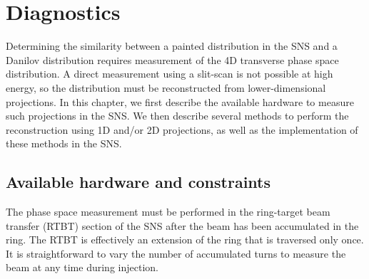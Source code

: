 \chapter{Diagnostics} \label{chap-4}

Determining the similarity between a painted distribution in the SNS and a Danilov distribution requires measurement of the 4D transverse phase space distribution. A direct measurement using a slit-scan \cite{Cathey2018} is not possible at high energy, so the distribution must be reconstructed from lower-dimensional projections. In this chapter, we first describe the available hardware to measure such projections in the SNS. We then describe several methods to perform the reconstruction using 1D and/or 2D projections, as well as the implementation of these methods in the SNS.


\section{Available hardware and constraints}

The phase space measurement must be performed in the ring-target beam transfer (RTBT) section of the SNS after the beam has been accumulated in the ring. The RTBT is effectively an extension of the ring that is traversed only once. It is straightforward to vary the number of accumulated turns to measure the beam at any time during injection. 

